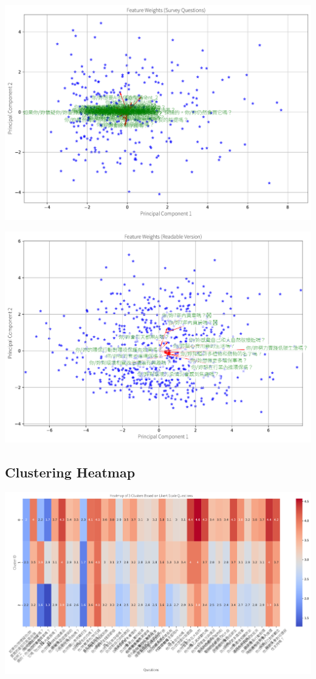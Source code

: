 \documentclass[
  letterpaper,
  DIV=11,
  numbers=noendperiod]{scrartcl}
\begin{document}
\includegraphics{_thesis_files/figure-pdf/cell-27-output-3.pdf}

\includegraphics{_thesis_files/figure-pdf/cell-27-output-4.pdf}

\subsection{Clustering Heatmap}\label{clustering-heatmap}

\includegraphics{_thesis_files/figure-pdf/cell-28-output-1.pdf}
\end{document}
